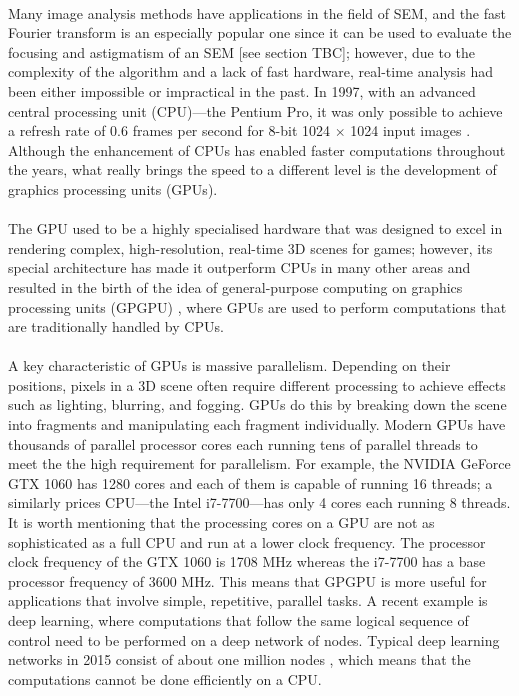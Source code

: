 \documentclass[12pt, twocolumn]{report}
\begin{document}
\paragraph{}
Many image analysis methods have applications in the field of SEM, and the fast Fourier transform is an especially popular one since it can be used to evaluate the focusing and astigmatism of an SEM [see section TBC]; however, due to the complexity of the algorithm and a lack of fast hardware, real-time analysis had been either impossible or impractical in the past. In 1997, with an advanced central processing unit (CPU)---the Pentium Pro, it was only possible to achieve a refresh rate of 0.6 frames per second for 8-bit 1024 $\times$ 1024 input images \cite{SEM image sharpness measurement}. Although the enhancement of CPUs has enabled faster computations throughout the years, what really brings the speed to a different level is the development of graphics processing units (GPUs).

\paragraph{}
The GPU used to be a highly specialised hardware that was designed to excel in rendering complex, high-resolution, real-time 3D scenes for games; however, its special architecture has made it outperform CPUs in many other areas and resulted in the birth of the idea of general-purpose computing on graphics processing units (GPGPU) \cite{GPU computing}, where GPUs are used to perform computations that are traditionally handled by CPUs.

\paragraph{}
A key characteristic of GPUs is massive parallelism. Depending on their positions, pixels in a 3D scene often require different processing to achieve effects such as lighting, blurring, and fogging. GPUs do this by breaking down the scene into fragments and manipulating each fragment individually. Modern GPUs have thousands of parallel processor cores each running tens of parallel threads to meet the the high requirement for parallelism. For example, the NVIDIA GeForce GTX 1060 has 1280 cores and each of them is capable of running 16 threads; a similarly prices CPU---the Intel i7-7700---has only 4 cores each running 8 threads. It is worth mentioning that the processing cores on a GPU are not as sophisticated as a full CPU and run at a lower clock frequency. The processor clock frequency of the GTX 1060 is 1708 MHz whereas the i7-7700 has a base processor frequency of 3600 MHz. This means that GPGPU is more useful for applications that involve simple, repetitive, parallel tasks. A recent example is deep learning, where computations that follow the same logical sequence of control need to be performed on a deep network of nodes. Typical deep learning networks in 2015 consist of about one million nodes \cite{Deep learning}, which means that the computations cannot be done efficiently on a CPU.
\end{document}

